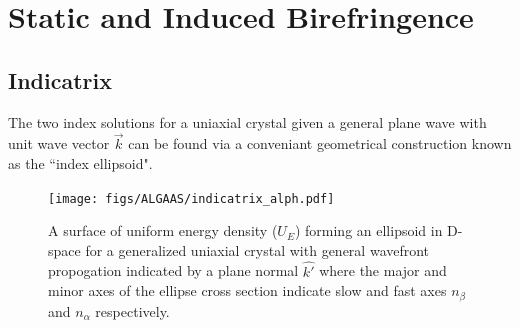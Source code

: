 %
%
%
%
\section{Static and Induced Birefringence}
\subsection{Indicatrix}\label{sec:indicatrix}
The two index solutions for a uniaxial crystal given a general plane wave with unit wave vector $\vec{k}$ can be found via a conveniant geometrical construction known as the ``index ellipsoid". 

\begin{figure}[ht!]
\begin{center}
\texttt{[image: figs/ALGAAS/indicatrix\_alph.pdf]}
\end{center}
\caption{A surface of uniform energy density ($U_E$) forming an ellipsoid in D-space for a generalized uniaxial crystal with general wavefront propogation indicated by a plane normal $\hat{k'}$ where the major and minor axes of the ellipse cross section indicate slow and fast axes $n_\beta$ and $n_\alpha$ respectively.}
\label{fig:genindtrx}
\end{figure}

